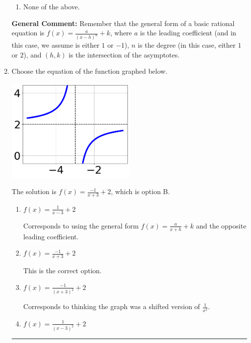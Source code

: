 \documentclass{extbook}[14pt]
\newcommand{\litem}[1]{\item #1

\rule{\textwidth}{0.4pt}}
\begin{document}
\begin{enumerate}
{\begin{enumerate}[label=\Alph*.]
\item None of the above.\end{enumerate}
\textbf{General Comment:} Remember that the general form of a basic rational equation is $ f(x) = \frac{a}{(x-h)^n} + k$, where $a$ is the leading coefficient (and in this case, we assume is either $1$ or $-1$), $n$ is the degree (in this case, either $1$ or $2$), and $(h, k)$ is the intersection of the asymptotes.
}
\litem{
Choose the equation of the function graphed below.

\begin{center}
    \includegraphics[width=0.5\textwidth]{../Figures/rationalGraphToEquationCopyC.png}
\end{center}


The solution is \( f(x) = \frac{-1}{x + 3} + 2 \), which is option B.\begin{enumerate}[label=\Alph*.]
\item \( f(x) = \frac{1}{x - 3} + 2 \)

Corresponds to using the general form $f(x) = \frac{a}{x+h}+k$ and the opposite leading coefficient.
\item \( f(x) = \frac{-1}{x + 3} + 2 \)

This is the correct option.
\item \( f(x) = \frac{-1}{(x + 3)^2} + 2 \)

Corresponds to thinking the graph was a shifted version of $\frac{1}{x^2}$.
\item \( f(x) = \frac{1}{(x - 3)^2} + 2 \)


\end{enumerate}}
\end{enumerate}
\end{document}
